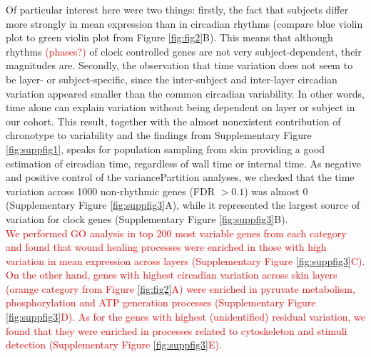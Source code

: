 {Of particular interest here were two things: firstly, the fact that subjects differ more strongly in mean expression than in circadian rhythms (compare blue violin plot to green violin plot from Figure \ref{fig:fig2}B). This means that although rhythms \textcolor{red}{(phases?)} of clock controlled genes are not very subject-dependent, their magnitudes are. Secondly, the observation that time variation does not seem to be layer- or subject-specific, since the inter-subject and inter-layer circadian variation appeared smaller than the common circadian variability. In other words, time alone can explain variation without being dependent on layer or subject in our cohort. This result, together with the almost nonexistent contribution of chronotype to variability and the findings from Supplementary Figure \ref{fig:suppfig1}, speaks for population sampling from skin providing a good estimation of circadian time, regardless of wall time or internal time. As negative and positive control of the variancePartition analyses, we checked that the time variation across 1000 non-rhythmic genes (FDR $>0.1$) was almost 0 (Supplementary Figure \ref{fig:suppfig3}A), while it represented the largest source of variation for clock genes (Supplementary Figure \ref{fig:suppfig3}B).\\ %

\textcolor{red}{We performed \textcolor{red}{GO analysis in top 200 most variable genes from each category} and found that wound healing processes were enriched in those with high variation in mean expression across layers (\textcolor{red}{Supplementary Figure \ref{fig:suppfig3}C}). On the other hand, genes with highest circadian variation across skin layers (orange category from Figure \ref{fig:fig2}A) were enriched in pyruvate metabolism, phosphorylation and ATP generation processes (Supplementary Figure \ref{fig:suppfig3}D). As for the genes with highest (unidentified) residual variation, we found that they were enriched in processes related to cytoskeleton and stimuli detection (\textcolor{red}{Supplementary Figure \ref{fig:suppfig3}E}).\\}

}
